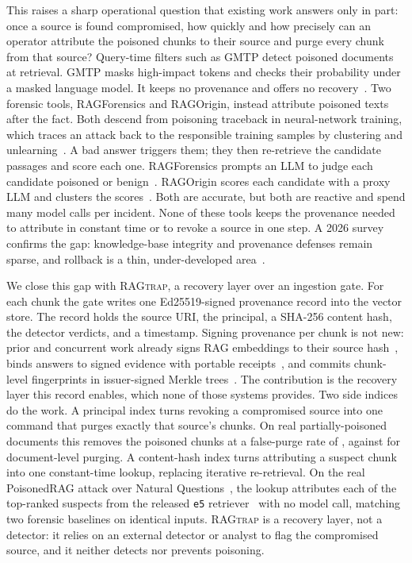 \documentclass[12pt]{article}
\newcommand{\sysname}{\textsc{RAGtrap}\xspace}
\begin{document}
This raises a sharp operational question that existing work answers only in
part: once a source is found compromised, how quickly and how precisely can an
operator attribute the poisoned chunks to their source and purge every chunk
from that source? Query-time filters such as GMTP detect poisoned documents at
retrieval. GMTP masks high-impact tokens and checks their probability under a
masked language model. It keeps no provenance and offers no
recovery~\cite{gmtp}. Two forensic tools, RAGForensics and RAGOrigin, instead
attribute poisoned texts after the fact. Both descend from poisoning traceback
in neural-network training, which traces an attack back to the responsible
training samples by clustering and unlearning~\cite{poison-forensics}. A bad
answer triggers them; they then re-retrieve the candidate passages and score
each one. RAGForensics prompts an LLM to judge each candidate poisoned or
benign~\cite{ragforensics}. RAGOrigin scores each candidate with a proxy LLM and
clusters the scores~\cite{ragorigin}. Both are accurate, but both are reactive
and spend many model calls per incident. None of these tools keeps the
provenance needed to attribute in constant time or to revoke a source in one
step. A 2026 survey confirms the gap: knowledge-base integrity and provenance
defenses remain sparse, and rollback is a thin, under-developed
area~\cite{ragsurvey}.

We close this gap with \sysname{}, a recovery layer over an ingestion gate. For
each chunk the gate writes one Ed25519-signed provenance record into the vector
store. The record holds the source URI, the principal, a SHA-256 content hash,
the detector verdicts, and a timestamp. Signing provenance per chunk is not new:
prior and concurrent work already signs RAG embeddings to their source
hash~\cite{VectorPin}, binds answers to signed evidence with portable
receipts~\cite{leray2025policy}, and commits chunk-level fingerprints in
issuer-signed Merkle trees~\cite{MerkleSpeech}. The contribution is the recovery
layer this record enables, which none of those systems provides. Two side
indices do the work. A principal index turns revoking a compromised source into
one command that purges exactly that source's chunks. On real
partially-poisoned documents this removes the poisoned chunks at a false-purge
rate of \textbf{\PerChunkFP{}}, against \textbf{\PerDocFP{}} for document-level
purging. A content-hash index turns attributing a suspect chunk into one
constant-time lookup, replacing iterative re-retrieval. On the real PoisonedRAG
attack over Natural Questions~\cite{naturalquestions}, the lookup attributes each
of the \NsuspectsE{} top-ranked suspects from the released \texttt{e5}
retriever~\cite{e5} with no model call, matching two forensic baselines on
identical inputs. \sysname{} is a recovery layer, not a detector: it relies on
an external detector or analyst to flag the compromised source, and it neither
detects nor prevents poisoning.
\end{document}
